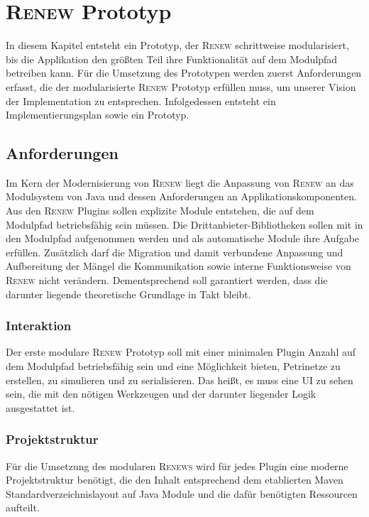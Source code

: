 \chapter{\textsc{Renew} Prototyp} 
	In diesem Kapitel entsteht ein Prototyp, der \textsc{Renew} schrittweise modularisiert, bis die Applikation den größten Teil ihre Funktionalität auf dem Modulpfad betreiben kann. \newline
	Für die Umsetzung des Prototypen werden zuerst Anforderungen erfasst, die der modularisierte \textsc{Renew} Prototyp erfüllen muss, um unserer Vision der Implementation zu entsprechen. Infolgedessen entsteht ein Implementierungsplan sowie ein Prototyp. 

\section{Anforderungen} \label{sec:anforderungen}
	Im Kern der Modernisierung von \textsc{Renew} liegt die Anpassung von \textsc{Renew} an das Modulsystem von Java und dessen Anforderungen an Applikationskomponenten. Aus den \textsc{Renew} Plugins sollen explizite Module entstehen, die auf dem Modulpfad betriebsfähig sein müssen. Die Drittanbieter-Bibliotheken sollen mit in den Modulpfad aufgenommen werden und als automatische Module ihre Aufgabe erfüllen. Zusätzlich darf die Migration und damit verbundene Anpassung und Aufbereitung der Mängel die Kommunikation sowie interne Funktionsweise von \textsc{Renew} nicht verändern. Dementsprechend soll garantiert werden, dass die darunter liegende theoretische Grundlage in Takt bleibt. 

\subsection{Interaktion}
	Der erste modulare \textsc{Renew} Prototyp soll mit einer minimalen Plugin Anzahl auf dem Modulpfad betriebsfähig sein und eine Möglichkeit bieten, Petrinetze zu erstellen, zu simulieren und zu serialisieren. Das heißt, es muss eine UI zu sehen sein, die mit den nötigen Werkzeugen und der darunter liegender Logik ausgestattet ist. 

\subsection{Projektstruktur}
	Für die Umsetzung des modularen \textsc{Renews} wird für jedes Plugin eine moderne Projektstruktur benötigt, die den Inhalt entsprechend dem etablierten Maven Standardverzeichnislayout auf Java Module und die dafür benötigten Ressourcen aufteilt. 

